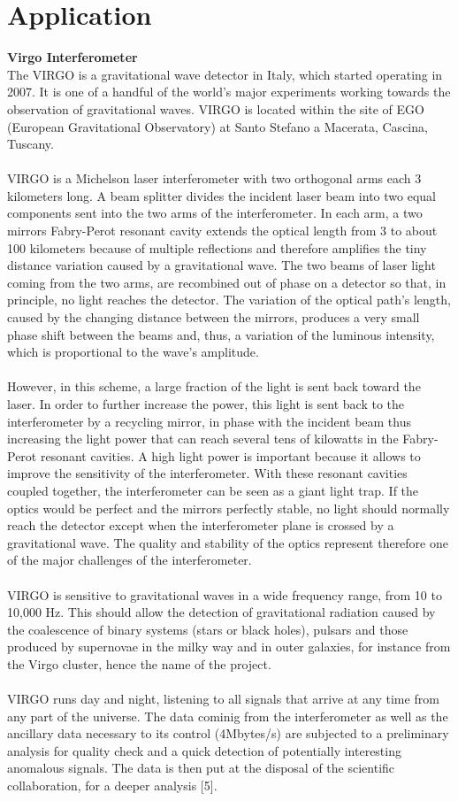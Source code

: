 \documentclass[a4paper,12pt]{report}
\begin{document}
\chapter{Application}
\textbf{Virgo Interferometer}\\
The VIRGO is a gravitational wave detector in Italy, which started operating in 2007. It is one of a handful of the world's major experiments working towards the observation of gravitational waves. VIRGO is located within the site of EGO (European Gravitational Observatory) at Santo Stefano a Macerata, Cascina, Tuscany.\\\\
VIRGO is a Michelson laser interferometer with two orthogonal arms each 3 kilometers long. A beam splitter divides the incident laser beam into two equal components sent into the two arms of the interferometer. In each arm, a two mirrors Fabry-Perot resonant cavity extends the optical length from 3 to about 100 kilometers because of multiple reflections and therefore amplifies the tiny distance variation caused by a gravitational wave. The two beams of laser light coming from the two arms, are recombined out of phase on a detector so that, in principle, no light reaches the detector. The variation of the optical path’s length, caused by the changing distance between the mirrors, produces a very small phase shift between the beams and, thus, a variation of the luminous intensity, which is proportional to the wave’s amplitude.\\\\
However, in this scheme, a large fraction of the light is sent back toward the laser. In order to further increase the power, this light is sent back to the interferometer by a recycling mirror, in phase with the incident beam thus increasing the light power that can reach several tens of kilowatts in the Fabry-Perot resonant cavities. A high light power is important because it allows to improve the sensitivity of the interferometer. With these resonant cavities coupled together, the interferometer can be seen as a giant light trap. If the optics would be perfect and the mirrors perfectly stable, no light should normally reach the detector except when the interferometer plane is crossed by a gravitational wave. The quality and stability of the optics represent therefore one of the major challenges of the interferometer.\\\\ 
VIRGO is sensitive to gravitational waves in a wide frequency range, from 10 to 10,000 Hz. This should allow the detection of gravitational radiation caused by the coalescence of binary systems (stars or black holes), pulsars and those produced by supernovae in the milky way and in outer galaxies, for instance from the Virgo cluster, hence the name of the project.\\\\ 
VIRGO runs day and night, listening to all signals that arrive at any time from any part of the universe. The data cominig from the interferometer as well as the ancillary data necessary to its control (4Mbytes/s) are subjected to a preliminary analysis for quality check and a quick detection of potentially interesting anomalous signals. The data is then put at the disposal of the scientific collaboration, for a deeper analysis [5].
\end{document}
